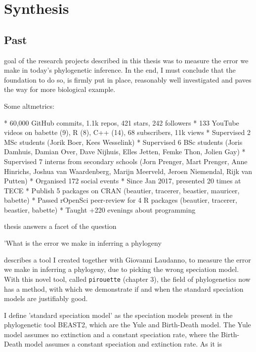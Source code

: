 \chapter{Synthesis}
\label{synthesis}
\newpage

\section{Past}

\noindent

 goal of the research projects
described in this thesis 
was to measure the error we make in today's phylogenetic inference.
In the end, I must conclude that the foundation to do so, is firmly 
put in place, reasonably well investigated and paves the way for
more biological example.

Some altmetrics:

 * 60,000 GitHub commits, 1.1k repos, 421 stars, 242 followers
 * 133 YouTube videos on babette (9), R (8), C++ (14), 68 subscribers, 11k views
 * Supervised 2 MSc students (Jorik Boer, Kees Wesselink)
 * Supervised 6 BSc students (Joris Damhuis, 
   Damian Over, Dave Nijhuis, Elles Jetten, Femke Thon, Jolien Gay)
 * Supervised 7 interns from secondary schools (Jorn Prenger, Mart Prenger, 
   Anne Hinrichs, Joshua van Waardenberg, Marijn Meerveld, Jeroen Niemendal, 
   Rijk van Putten)
 * Organised 172 social events
 * Since Jan 2017, presented 20 times at TECE
 * Publish 5 packages on CRAN (beautier, tracerer, beastier, mauricer, babette)
 * Passed rOpenSci peer-review for 4 R packages (beautier, tracerer, beastier, babette)
 * Taught +220 evenings about programming

 thesis answers a facet of the question 


'What is the error we make in inferring a phylogeny

describes a tool I created together with Giovanni Laudanno, 
to measure the error we make in inferring a phylogeny, due to
picking the wrong speciation model. 
With this novel tool, called \verb;pirouette; (chapter 3),
the field of phylogenetics now has a method, 
with which we demonstrate if and when the standard speciation models
are justifiably good. 

I define 'standard speciation model' as the speciation models 
present in the phylogenetic tool BEAST2, which are the Yule and
Birth-Death model. The Yule model assumes no extinction
and a constant speciation rate, where the Birth-Death model
assumes a constant speciation and extinction rate. As
it is 

